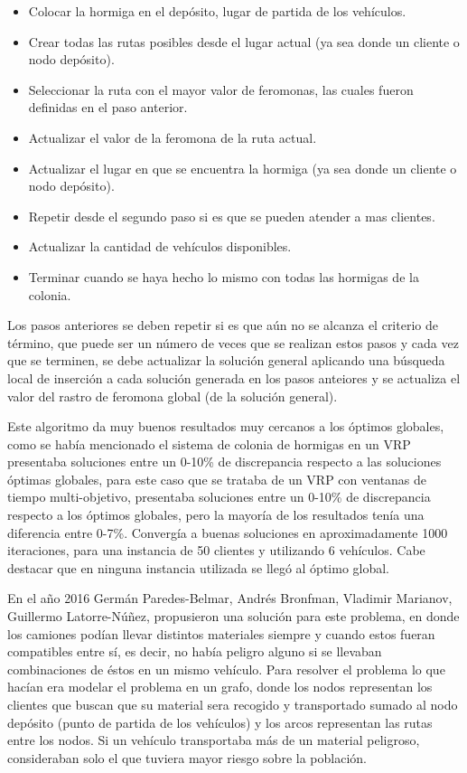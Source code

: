 \documentclass[conference]{IEEEtran}
\begin{document}
\begin{itemize}
\item Colocar la hormiga en el dep\'osito, lugar de partida de los veh\'iculos.
\item Crear todas las rutas posibles desde el lugar actual (ya sea donde un cliente o nodo dep\'osito).
\item Seleccionar la ruta con el mayor valor de feromonas, las cuales fueron definidas en el paso anterior.
\item Actualizar el valor de la feromona de la ruta actual.
\item Actualizar el lugar en que se encuentra la hormiga (ya sea donde un cliente o nodo dep\'osito).
\item Repetir desde el segundo paso si es que se pueden atender a mas clientes.
\item Actualizar la cantidad de veh\'iculos disponibles.
\item Terminar cuando se haya hecho lo mismo con todas las hormigas de la colonia.
\end{itemize}

Los pasos anteriores se deben repetir si es que a\'un no se alcanza el criterio de t\'ermino, que puede ser un n\'umero de veces que se realizan estos pasos y cada vez que se terminen, se debe actualizar la soluci\'on general aplicando una b\'usqueda local de inserci\'on a cada soluci\'on generada en los pasos anteiores y se actualiza el valor del rastro de feromona global (de la soluci\'on general). 

Este algoritmo da muy buenos resultados muy cercanos a los \'optimos globales, como se hab\'ia mencionado el sistema de colonia de hormigas en un VRP presentaba soluciones entre un 0-10\% de discrepancia respecto a las soluciones \'optimas globales, para este caso que se trataba de un VRP con ventanas de tiempo multi-objetivo, presentaba soluciones entre un 0-10\% de discrepancia respecto a los \'optimos globales, pero la mayor\'ia de los resultados ten\'ia una diferencia entre 0-7\%. Converg\'ia a buenas soluciones en aproximadamente 1000 iteraciones, para una instancia de 50 clientes y utilizando 6 veh\'iculos. Cabe destacar que en ninguna instancia utilizada se lleg\'o al \'optimo global.

En el a\~no 2016 \cite{b2}  Germ\'an Paredes-Belmar, Andr\'es Bronfman, Vladimir Marianov, Guillermo Latorre-N\'u\~nez, propusieron una soluci\'on para este problema, en donde los camiones pod\'ian llevar distintos materiales siempre y cuando estos fueran compatibles entre s\'i, es decir, no hab\'ia peligro alguno si se llevaban combinaciones de \'estos en un mismo veh\'iculo. Para resolver el problema lo que hac\'ian era modelar el problema en un grafo, donde los nodos representan los clientes que buscan que su material sera recogido y transportado sumado al nodo dep\'osito (punto de partida de los veh\'iculos) y los arcos representan las rutas entre los nodos. Si un veh\'iculo transportaba m\'as de un material peligroso, consideraban solo el que tuviera mayor riesgo sobre la poblaci\'on.
\end{document}
